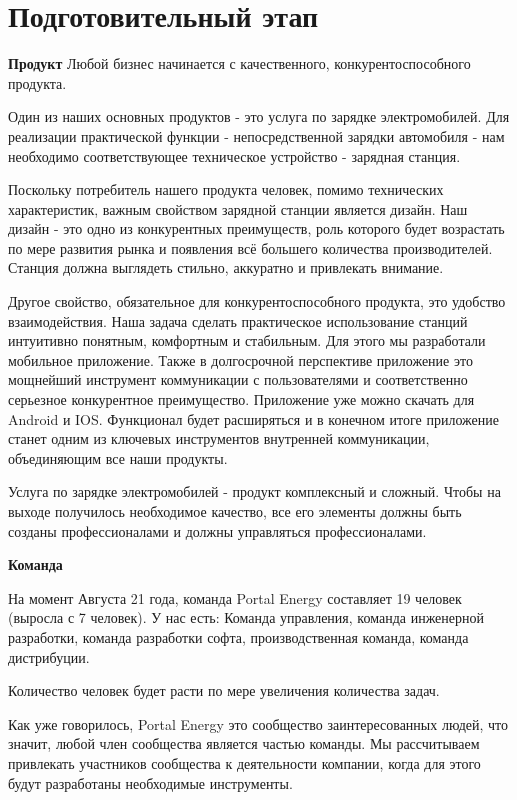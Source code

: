\documentclass[a4paper,12pt]{report}
\begin{document}
\section*{Подготовительный этап}
\textbf{Продукт}
Любой бизнес начинается с качественного, конкурентоспособного продукта. 

Один из наших основных продуктов - это услуга по зарядке электромобилей. Для реализации практической функции - непосредственной зарядки автомобиля - нам необходимо соответствующее техническое устройство - зарядная станция. 

Поскольку потребитель нашего продукта человек, помимо технических характеристик, важным свойством зарядной станции является дизайн. Наш дизайн - это одно из конкурентных преимуществ, роль которого будет возрастать по мере развития рынка и появления всё большего количества производителей. Станция должна выглядеть стильно, аккуратно и привлекать внимание. 

Другое свойство, обязательное для конкурентоспособного продукта, это удобство взаимодействия. Наша задача сделать практическое использование станций интуитивно понятным, комфортным и стабильным. Для этого мы разработали мобильное приложение. Также в долгосрочной перспективе приложение это мощнейший инструмент коммуникации с пользователями и соответственно серьезное конкурентное преимущество. Приложение уже можно скачать для Android и IOS. Функционал будет расширяться и в конечном итоге приложение станет одним из ключевых инструментов внутренней коммуникации, объединяющим все наши продукты.

Услуга по зарядке электромобилей - продукт комплексный и сложный. Чтобы на выходе получилось необходимое качество, все его элементы должны быть созданы профессионалами и должны управляться профессионалами.

\textbf{Команда}

На момент Августа 21 года, команда Portal Energy составляет 19 человек (выросла с 7 человек). У нас есть:
Команда управления, 
команда инженерной разработки, 
команда разработки софта, 
производственная команда,
команда дистрибуции. 

Количество человек будет расти по мере увеличения количества задач. 

Как уже говорилось, Portal Energy это сообщество заинтересованных людей, что значит, любой член сообщества является частью команды. Мы рассчитываем привлекать участников сообщества к деятельности компании, когда для этого будут разработаны необходимые инструменты.
\end{document}
